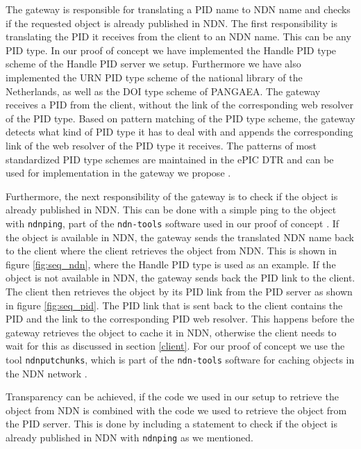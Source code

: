 The gateway is responsible for translating a PID name to NDN name and checks if the requested object is already published in NDN. 
The first responsibility is translating the PID it receives from the client to an NDN name. This can be any PID type. In our proof of concept we have implemented the Handle PID type scheme of the Handle PID server we setup. Furthermore we have also implemented the URN PID type scheme of the national library of the Netherlands, as well as the DOI type scheme of PANGAEA. The gateway receives a PID from the client, without the link of the corresponding web resolver of the PID type. Based on pattern matching of the PID type scheme, the gateway detects what kind of PID type it has to deal with and appends the corresponding link of the web resolver of the PID type it receives. 
The patterns of most standardized PID type schemes are maintained in the ePIC DTR and can be used for implementation in the gateway we propose \cite{dtr}. 

Furthermore, the next responsibility of the gateway is to check if the object is already published in NDN. This can be done with a simple ping to the object with \texttt{ndnping}, part of the \texttt{ndn-tools} software used in our proof of concept \cite{ndn-tools}. 
If the object is available in NDN, the gateway sends the translated NDN name back to the client where the client retrieves the object from NDN. This is shown in figure \ref{fig:seq_ndn}, where the Handle PID type is used as an example. If the object is not available in NDN, the gateway sends back the PID link to the client. The client then retrieves the object by its PID link from the PID server as shown in figure \ref{fig:seq_pid}. The PID link that is sent back to the client contains the PID and the link to the corresponding PID web resolver. This happens before the gateway retrieves the object to cache it in NDN, otherwise the client needs to wait for this as discussed in section \ref{client}. For our proof of concept we use the tool \texttt{ndnputchunks}, which is part of the \texttt{ndn-tools} software for caching objects in the NDN network \cite{ndn-tools}.

Transparency can be achieved, if the code we used in our setup to retrieve the object from NDN is combined with the code we used to retrieve the object from the PID server. This is done by including a statement to check if the object is already published in NDN with \texttt{ndnping} as we mentioned. 

